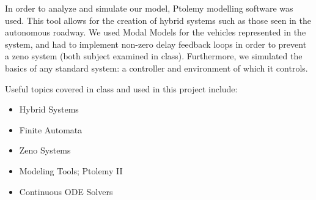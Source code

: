 In order to analyze and simulate our model, Ptolemy modelling software was used.  This tool allows for the creation of hybrid systems such as those seen in the autonomous roadway.  We used Modal Models for the vehicles represented in the system, and had to implement non-zero delay feedback loops in order to prevent a zeno system (both subject examined in class).  Furthermore, we simulated the basics of any standard system: a controller and environment of which it controls.

Useful topics covered in class and used in this project include:
\begin{itemize}
\setlength{\itemsep}{0pt}
\setlength{\parskip}{0pt}
\item Hybrid Systems
\item Finite Automata
\item Zeno Systems
\item Modeling Tools; Ptolemy II
\item Continuous ODE Solvers
\end{itemize}


